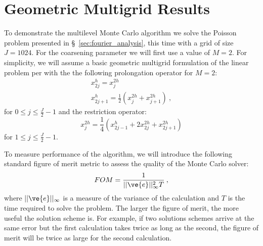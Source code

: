 \documentclass[note]{TechNote}
\begin{document}
\section{Geometric Multigrid Results}
\label{sec:geometric_results}
To demonstrate the multilevel Monte Carlo algorithm we solve the
Poisson problem presented in \S~\ref{sec:fourier_analysis}, this time
with a grid of size $J = 1024$. For the coarsening parameter we will
first use a value of $M = 2$. For simplicity, we will assume a basic
geometric multigrid formulation of the linear problem per
\cite{briggs_multigrid} with the the following prolongation operator
for $M=2$:
\begin{subequations}
  \begin{gather}
    x^h_{2j} = x_j^{2h} \\
    x^h_{2j+1} = \frac{1}{2} ( x_j^{2h} + x_{j+1}^{2h} )\:,
  \end{gather}
  \label{eq:m2_prolongation}
\end{subequations}
for $0 \leq j \leq \frac{J}{2} - 1$ and the restriction operator:
\begin{equation}
  x^{2h}_j = \frac{1}{4} ( x_{2j-1}^{h} + 2 x_{2j}^{2h} + x_{2j+1}^{2h} )
  \label{eq:m2_restriction}
\end{equation}
for $1 \leq j \leq \frac{J}{2} - 1$.

To measure performance of the algorithm, we will introduce the
following standard figure of merit metric to assess the quality of the
Monte Carlo solver:
\begin{equation}
  FOM = \frac{1}{||\ve{e}||^2_{\infty} T}\:,
  \label{eq:figure_of_merit}
\end{equation}
where $||\ve{e}||_{\infty}$ is a measure of the variance of the
calculation and $T$ is the time required to solve the problem. The
larger the figure of merit, the more useful the solution scheme
is. For example, if two solutions schemes arrive at the same error but
the first calculation takes twice as long as the second, the figure of
merit will be twice as large for the second calculation.
\end{document}

